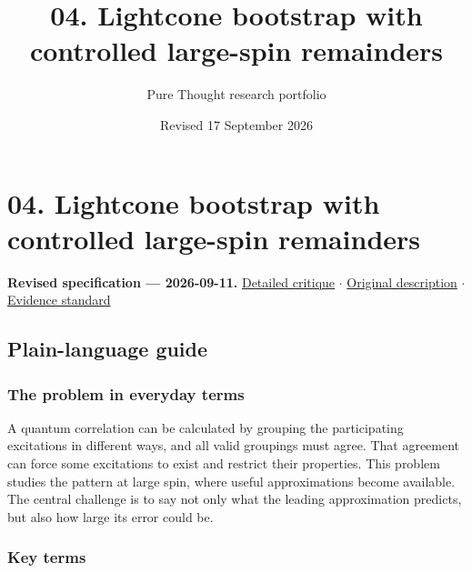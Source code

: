 \documentclass[
  11pt,
]{article}
\title{04. Lightcone bootstrap with controlled large-spin remainders}
\author{Pure Thought research portfolio}
\date{Revised 17 September 2026}
\begin{document}
\maketitle
\thispagestyle{empty}
\clearpage

\section{04. Lightcone bootstrap with controlled large-spin remainders}

\textbf{Revised specification --- 2026-09-11.}
\href{https://github.com/rick-stevens-ai/Pure-Thought/blob/main/reviews/04-Modular-Lightcone-Bootstrap.md}{Detailed
critique} \ensuremath{\cdot}
\href{https://github.com/rick-stevens-ai/Pure-Thought/blob/main/archive/original-PRDs/04-Modular-Lightcone-Bootstrap.md}{Original
description} \ensuremath{\cdot}
\href{https://github.com/rick-stevens-ai/Pure-Thought/blob/main/reviews/EVIDENCE-STANDARD.md}{Evidence
standard}

\subsection{Plain-language guide}

\subsubsection{The problem in everyday terms}

A quantum correlation can be calculated by grouping the participating
excitations in different ways, and all valid groupings must agree. That
agreement can force some excitations to exist and restrict their
properties. This problem studies the pattern at large spin, where useful
approximations become available. The central challenge is to say not
only what the leading approximation predicts, but also how large its
error could be.

\subsubsection{Key terms}
\end{document}
